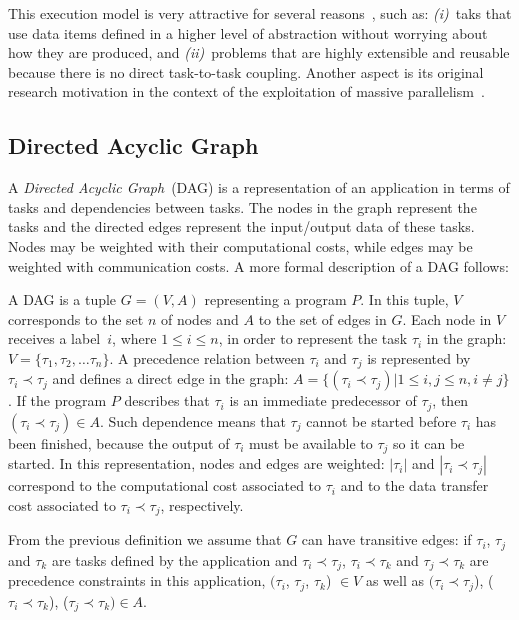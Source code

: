 \documentclass[twocolumn]{svjour3}
\begin{document}
This execution model is very attractive for several reasons~\cite{prasanna2005}, such as:  {\em (i)}~{\color{blue}taks that use} data items defined in a higher level of abstraction without worrying about how they are produced, and {\em (ii)}~{\color{blue}problems that are} highly extensible and reusable because there is no direct task-to-task coupling. Another aspect is its original research motivation in the context of the exploitation of massive parallelism~\cite{dataflowAdvances2004}.

\subsection{Directed Acyclic Graph}

A \emph{Directed Acyclic Graph}~(DAG) is a representation of an application in terms of tasks and {\color{blue}dependencies} between tasks. The nodes in the graph represent the tasks and the directed edges represent the input/output data of these tasks. Nodes may be weighted with their computational costs, while edges may be weighted with communication costs. A more formal description of a DAG follows: 

\begin{definition}
A DAG is a tuple $G = (V, A) $ representing a program $P$. In this tuple, $V$ corresponds to the set $n$ of nodes and $A$ to the set of edges in $G$. Each node in $V$ receives a label~$i$, where $1 \le i \le n$, in order to represent the task $\tau_i$ in the graph: $V = \{\tau_1, \tau_2, … \tau_n\}$.
A precedence relation between $\tau_i$ and $\tau_j$ is represented by $\tau_i \prec \tau_j$ and defines a direct edge in the graph: $A = \{(\tau_i \prec \tau_j) | 1 \le i,j \le n, i \neq j\}$. If the program $P$ describes that $\tau_i$ is an immediate predecessor of $\tau_j$, then $(\tau_i \prec \tau_j) \in A$. Such dependence means that $\tau_j$ cannot be started before $\tau_i$ has been finished, because the output of $\tau_i$ must be available to $\tau_j$ so it can be started.
In this representation, nodes and edges are weighted: $|\tau_i|$ and $|\tau_i \prec \tau_j|$ correspond to the computational cost associated to $\tau_i$ and to the data transfer cost associated to $\tau_i \prec \tau_j$, respectively. 
\end{definition}

From the previous definition we assume that $G$ can have transitive edges: if $\tau_i$, $\tau_j$ and $\tau_k$ are tasks defined by the application and $\tau_i \prec \tau_j$, $\tau_i \prec \tau_k$ and $\tau_j \prec \tau_k$ are precedence constraints in this application, $(\tau_i$, $\tau_j$, $\tau_k$) $\in V$ as well as $(\tau_i \prec \tau_j$), ($\tau_i \prec \tau_k$), ($\tau_j \prec \tau_k) \in A$.
\end{document}
